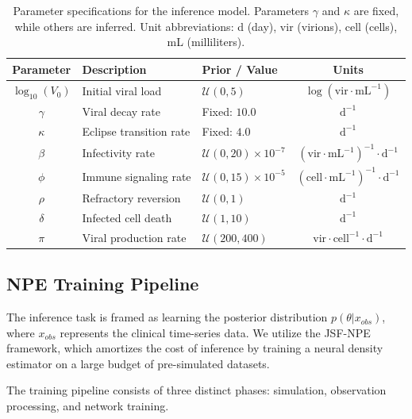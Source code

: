 \documentclass{article}
\begin{document}
\begin{table}[htbp]
\centering
\caption{Parameter specifications for the inference model. Parameters $\gamma$ and $\kappa$ are fixed, while others are inferred. Unit abbreviations: d (day), vir (virions), cell (cells), mL (milliliters).}
\label{tab:priors}
\begin{tabular}{@{}cllc@{}}
\toprule
\textbf{Parameter} & \textbf{Description} & \textbf{Prior / Value} & \textbf{Units} \\
\midrule
    $\log_{10}(V_0)$ & Initial viral load & $\mathcal{U}(0, 5)$ & $\log(\text{vir} \cdot \text{mL}^{-1})$ \\
    $\gamma$ & Viral decay rate & Fixed: $10.0$ & $\text{d}^{-1}$ \\
    $\kappa$ & Eclipse transition rate & Fixed: $4.0$ & $\text{d}^{-1}$ \\
    $\beta$ & Infectivity rate & $\mathcal{U}(0, 20) \times 10^{-7}$ & $(\text{vir} \cdot \text{mL}^{-1})^{-1} \cdot \text{d}^{-1}$ \\
    $\phi$ & Immune signaling rate & $\mathcal{U}(0, 15) \times 10^{-5}$ & $(\text{cell} \cdot \text{mL}^{-1})^{-1} \cdot \text{d}^{-1}$ \\
    $\rho$ & Refractory reversion & $\mathcal{U}(0, 1)$ & $\text{d}^{-1}$ \\
    $\delta$ & Infected cell death & $\mathcal{U}(1, 10)$ & $\text{d}^{-1}$ \\
    $\pi$ & Viral production rate & $\mathcal{U}(200, 400)$ & $\text{vir} \cdot \text{cell}^{-1} \cdot \text{d}^{-1}$ \\
\bottomrule
\end{tabular}
\end{table}



\subsection{NPE Training Pipeline}

The inference task is framed as learning the posterior distribution $p(\theta | x_{obs})$, where $x_{obs}$ represents the clinical time-series data. We utilize the JSF-NPE framework, which amortizes the cost of inference by training a neural density estimator on a large budget of pre-simulated datasets.

The training pipeline consists of three distinct phases: simulation, observation processing, and network training.
\end{document}
